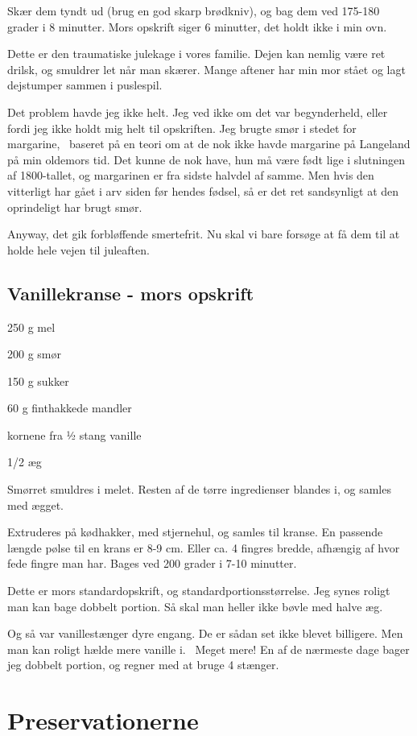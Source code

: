 \documentclass[
]{book}
\begin{document}
Skær dem tyndt ud (brug en god skarp brødkniv), og bag dem ved 175-180 grader i 8 minutter. Mors opskrift siger 6 minutter, det holdt ikke i min ovn.

Dette er den traumatiske julekage i vores familie. Dejen kan nemlig være ret drilsk, og smuldrer let når man skærer. Mange aftener har min mor stået og lagt dejstumper sammen i puslespil.

Det problem havde jeg ikke helt. Jeg ved ikke om det var begynderheld, eller fordi jeg ikke holdt mig helt til opskriften. Jeg brugte smør i stedet for margarine,~ baseret på en teori om at de nok ikke havde margarine på Langeland på min oldemors tid. Det kunne de nok have, hun må være født lige i slutningen af 1800-tallet, og margarinen er fra sidste halvdel af samme. Men hvis den vitterligt har gået i arv siden før hendes fødsel, så er det ret sandsynligt at den oprindeligt har brugt smør.

Anyway, det gik forbløffende smertefrit. Nu skal vi bare forsøge at få dem til at holde hele vejen til juleaften.

\section{Vanillekranse - mors opskrift}\label{vanillekranse---mors-opskrift}

250 g mel

200 g smør

150 g sukker

60 g finthakkede mandler

kornene fra ½ stang vanille

1/2 æg

Smørret smuldres i melet. Resten af de tørre ingredienser blandes i, og samles med ægget.

Extruderes på kødhakker, med stjernehul, og samles til kranse. En passende længde pølse til en krans er 8-9 cm. Eller ca. 4 fingres bredde, afhængig af hvor fede fingre man har. Bages ved 200 grader i 7-10 minutter.

Dette er mors standardopskrift, og standardportionsstørrelse. Jeg synes roligt man kan bage dobbelt portion. Så skal man heller ikke bøvle med halve æg.

Og så var vanillestænger dyre engang. De er sådan set ikke blevet billigere. Men man kan roligt hælde mere vanille i.~ Meget mere! En af de nærmeste dage bager jeg dobbelt portion, og regner med at bruge 4 stænger.

\chapter{Preservationerne}\label{preservationerne}
\end{document}
